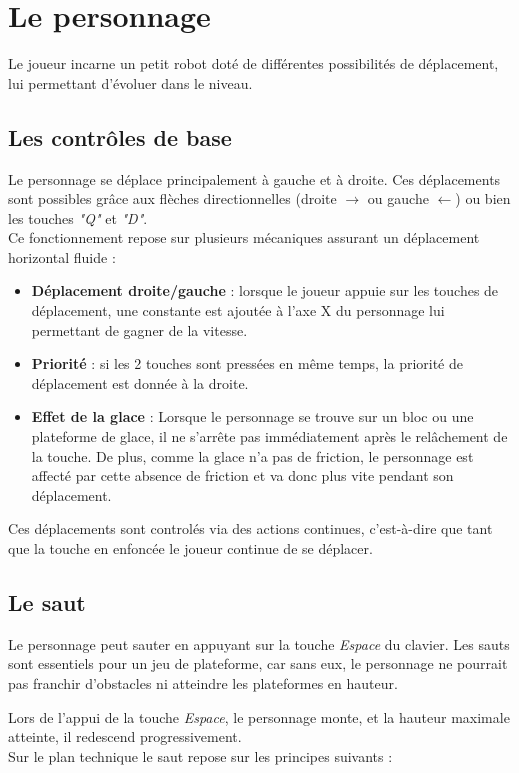\documentclass[10pt]{report}
\begin{document}
\section{Le personnage}
Le joueur incarne un petit robot doté de différentes possibilités de déplacement, lui permettant d'évoluer dans le niveau.

\subsection{Les contrôles de base}
Le personnage se déplace principalement à gauche et à droite. Ces déplacements sont possibles grâce aux flèches directionnelles (droite $\rightarrow$ ou gauche $\leftarrow$) ou bien les touches \emph{"Q"} et \emph{"D"}.\\
Ce fonctionnement repose sur plusieurs mécaniques assurant un déplacement horizontal fluide :

\begin{itemize}
  \item \textbf{Déplacement droite/gauche} : lorsque le joueur appuie sur les touches de déplacement, une constante est ajoutée à l'axe X du personnage lui permettant de gagner de la vitesse.
  \item \textbf{Priorité} : si les 2 touches sont pressées en même temps, la priorité de déplacement est donnée à la droite.
  \item \textbf{Effet de la glace} : Lorsque le personnage se trouve sur un bloc ou une plateforme de glace, il ne s'arrête pas immédiatement après le relâchement de la touche. De plus, comme la glace n'a pas de friction, le personnage est affecté par cette absence de friction et va donc plus vite pendant son déplacement.
\end{itemize}

Ces déplacements sont controlés via des actions continues, c'est-à-dire que tant que la touche en enfoncée le joueur continue de se déplacer. 


\subsection{Le saut}
Le personnage peut sauter en appuyant sur la touche \emph{Espace} du clavier. Les sauts sont essentiels pour un jeu de plateforme, car sans eux, le personnage ne pourrait pas franchir d'obstacles ni atteindre les plateformes en hauteur. 

Lors de l'appui de la touche \emph{Espace}, le personnage monte, et la hauteur maximale atteinte, il redescend progressivement. \\
Sur le plan technique le saut repose sur les principes suivants : 
\end{document}
